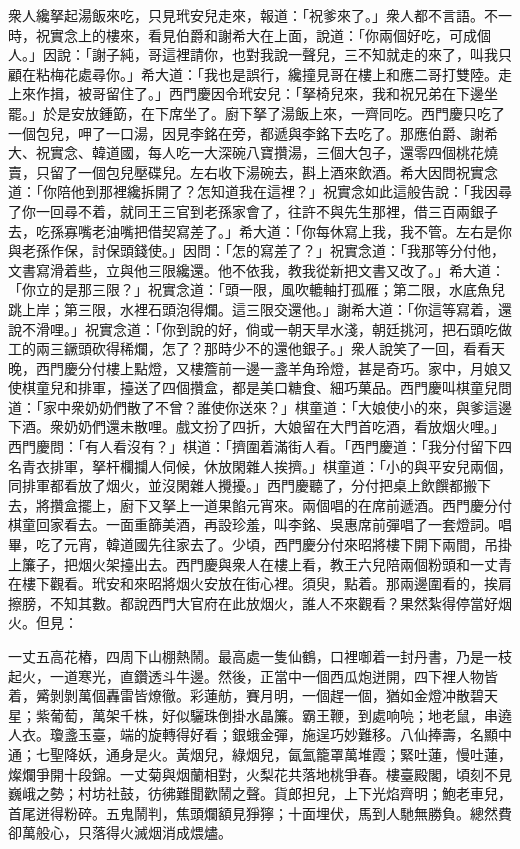 衆人纔拏起湯飯來吃，只見玳安兒走來，報道：「祝爹來了。」{}衆人都不言語。{}不一時，祝實念上的樓來，看見伯爵和謝希大在上面，說道：「你兩個好吃，可成個人。」因說：「謝子純，哥這裡請你，也對我說一聲兒，三不知就走的來了，叫我只顧在粘梅花處尋你。」希大道：「我也是誤行，纔撞見哥在樓上和應二哥打雙陸。走上來作揖，被哥留住了。」西門慶因令玳安兒：「拏椅兒來，我和祝兄弟在下邊坐罷。」於是安放鍾筯，在下席坐了。廚下拏了湯飯上來，一齊同吃。西門慶只吃了一個包兒，呷了一口湯，因見李銘在旁，都遞與李銘下去吃了。那應伯爵、謝希大、祝實念、韓道國，每人吃一大深碗八寶攢湯，三個大包子，還零四個桃花燒賣，只留了一個包兒壓碟兒。左右收下湯碗去，斟上酒來飲酒。希大因問祝實念道：「你陪他到那裡纔拆開了？怎知道我在這裡？」祝實念如此這般告說：「我因尋了你一回尋不着，就同王三官到老孫家會了，往許不與先生{}那裡，借三百兩銀子去，吃孫寡嘴老油嘴把借契寫差了。」希大道：「你每休寫上我，我不管。左右是你與老孫作保，討保頭錢使。」因問：「怎的寫差了？」祝實念道：「我那等分付他，文書寫滑着些，立與他三限纔還。他不依我，教我從新把文書又改了。」希大道：「你立的是那三限？」祝實念道：「頭一限，風吹轆軸打孤雁；第二限，水底魚兒跳上岸；第三限，水裡石頭泡得爛。這三限交還他。」謝希大道：「你這等寫着，還說不滑哩。」祝實念道：「你到說的好，倘或一朝天旱水淺，朝廷挑河，把石頭吃做工的兩三鐝頭砍得稀爛，怎了？那時少不的還他銀子。」{}衆人說笑了一回，看看天晚，西門慶分付樓上點燈，又樓簷前一邊一盞羊角玲燈，甚是奇巧。家中，月娘又使棋童兒和排軍，擡送了四個攢盒，都是美口糖食、細巧菓品。西門慶叫棋童兒問道：「家中衆奶奶們散了不曾？誰使你送來？」棋童道：「大娘使小的來，與爹這邊下酒。衆奶奶們還未散哩。戲文扮了四折，大娘留在大門首吃酒，看放烟火哩。」西門慶問：「有人看沒有？」棋道：「擠圍着滿街人看。「西門慶道：「我分付留下四名青衣排軍，拏杆欄攔人伺候，休放閑雜人挨擠。」棋童道：「小的與平安兒兩個，同排軍都看放了烟火，並沒閑雜人攪擾。」西門慶聽了，分付把桌上飲饌都搬下去，將攢盒擺上，廚下又拏上一道果餡元宵來。兩個唱的在席前遞酒。西門慶分付棋童回家看去。一面重篩美酒，再設珍羞，叫李銘、吳惠席前彈唱了一套燈詞。唱畢，吃了元宵，韓道國先往家去了。{}少頃，西門慶分付來昭將樓下開下兩間，吊掛上簾子，把烟火架擡出去。西門慶與衆人在樓上看，教王六兒陪兩個粉頭和一丈青在樓下觀看。玳安和來昭將烟火安放在街心裡。須臾，點着。那兩邊圍看的，挨肩擦膀，不知其數。都說西門大官府在此放烟火，誰人不來觀看？果然紮得停當好烟火。但見：

\begin{myquote}
一丈五高花樁，四周下山棚熱鬧。最高處一隻仙鶴，口裡啣着一封丹書，乃是一枝起火，一道寒光，直鑽透斗牛邊。然後，正當中一個西瓜炮迸開，四下裡人物皆着，觱剝剝萬個轟雷皆燎徹。彩蓮舫，賽月明，一個趕一個，猶如金燈冲散碧天星；紫葡萄，萬架千株，好似驪珠倒掛水晶簾。霸王鞭，到處响喨；地老鼠，串遶人衣。瓊盞玉臺，端的旋轉得好看；銀蛾金彈，施逞巧妙難移。八仙捧壽，名顯中通；七聖降妖，通身是火。黃烟兒，綠烟兒，氤氳籠罩萬堆霞；緊吐蓮，慢吐蓮，燦爛爭開十段錦。一丈菊與烟蘭相對，火梨花共落地桃爭春。樓臺殿閣，頃刻不見巍峨之勢；村坊社鼓，彷彿難聞歡鬧之聲。貨郎担兒，上下光焰齊明；鮑老車兒，首尾迸得粉碎。五鬼鬧判，焦頭爛額見猙獰；十面埋伏，馬到人馳無勝負。總然費卻萬般心，只落得火滅烟消成煨燼。
\end{myquote}

